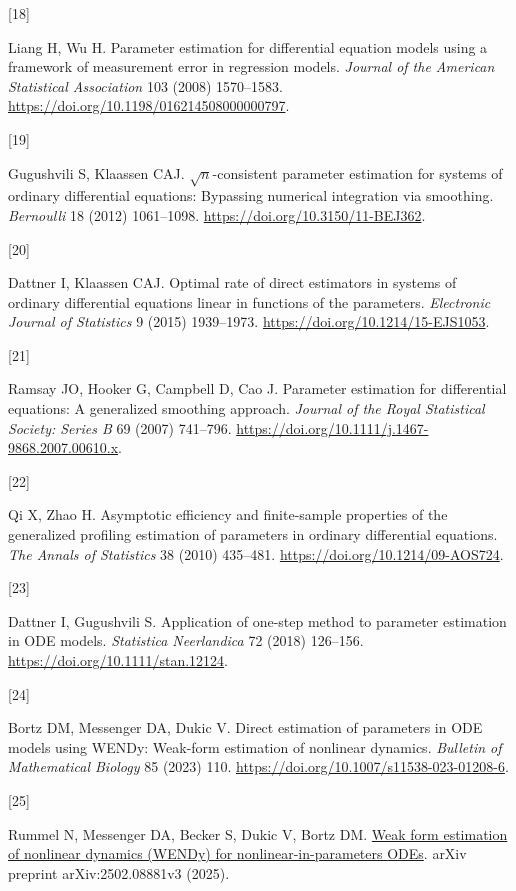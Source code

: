 \documentclass[
  american,
  11pt,
]{article}
\newlength{\cslhangindent}
\newlength{\csllabelwidth}
\newenvironment{CSLReferences}[2] %
 {\begin{list}{}{%
  \setlength{\itemindent}{0pt}
  \setlength{\leftmargin}{0pt}
  \setlength{\parsep}{0pt}
  \ifodd #1
   \setlength{\leftmargin}{\cslhangindent}
   \setlength{\itemindent}{-1\cslhangindent}
  \fi
  \setlength{\itemsep}{#2\baselineskip}}}
 {\end{list}}
\newcommand{\CSLLeftMargin}[1]{\parbox[t]{\csllabelwidth}{\strut#1\strut}}
\newcommand{\CSLRightInline}[1]{\parbox[t]{\linewidth - \csllabelwidth}{\strut#1\strut}}
\begin{document}
\begin{CSLReferences}{0}{0}
\CSLLeftMargin{{[}18{]} }%
\CSLRightInline{Liang H, Wu H. Parameter estimation for differential
equation models using a framework of measurement error in regression
models. \emph{Journal of the American Statistical Association} 103
(2008) 1570--1583. \url{https://doi.org/10.1198/016214508000000797}.}

\CSLLeftMargin{{[}19{]} }%
\CSLRightInline{Gugushvili S, Klaassen CAJ. \(\sqrt{n}\)-consistent
parameter estimation for systems of ordinary differential equations:
Bypassing numerical integration via smoothing. \emph{Bernoulli} 18
(2012) 1061--1098. \url{https://doi.org/10.3150/11-BEJ362}.}

\CSLLeftMargin{{[}20{]} }%
\CSLRightInline{Dattner I, Klaassen CAJ. Optimal rate of direct
estimators in systems of ordinary differential equations linear in
functions of the parameters. \emph{Electronic Journal of Statistics} 9
(2015) 1939--1973. \url{https://doi.org/10.1214/15-EJS1053}.}

\CSLLeftMargin{{[}21{]} }%
\CSLRightInline{Ramsay JO, Hooker G, Campbell D, Cao J. Parameter
estimation for differential equations: A generalized smoothing approach.
\emph{Journal of the Royal Statistical Society: Series B} 69 (2007)
741--796. \url{https://doi.org/10.1111/j.1467-9868.2007.00610.x}.}

\CSLLeftMargin{{[}22{]} }%
\CSLRightInline{Qi X, Zhao H. Asymptotic efficiency and finite-sample
properties of the generalized profiling estimation of parameters in
ordinary differential equations. \emph{The Annals of Statistics} 38
(2010) 435--481. \url{https://doi.org/10.1214/09-AOS724}.}

\CSLLeftMargin{{[}23{]} }%
\CSLRightInline{Dattner I, Gugushvili S. Application of one-step method
to parameter estimation in {ODE} models. \emph{Statistica Neerlandica}
72 (2018) 126--156. \url{https://doi.org/10.1111/stan.12124}.}

\CSLLeftMargin{{[}24{]} }%
\CSLRightInline{Bortz DM, Messenger DA, Dukic V. Direct estimation of
parameters in {ODE} models using {WENDy}: Weak-form estimation of
nonlinear dynamics. \emph{Bulletin of Mathematical Biology} 85 (2023)
110. \url{https://doi.org/10.1007/s11538-023-01208-6}.}

\CSLLeftMargin{{[}25{]} }%
\CSLRightInline{Rummel N, Messenger DA, Becker S, Dukic V, Bortz DM.
\href{https://arxiv.org/abs/2502.08881v3}{Weak form estimation of
nonlinear dynamics ({WENDy}) for nonlinear-in-parameters {ODEs}}. arXiv
preprint arXiv:2502.08881v3 (2025).}


\end{CSLReferences}
\end{document}
